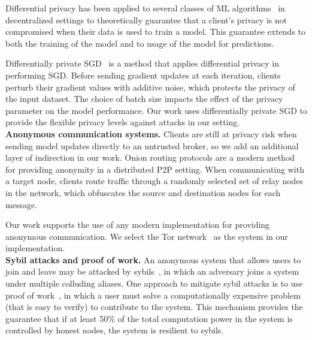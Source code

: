 Differential privacy has been applied to several classes of ML
algorithms~\cite{Shokri:2015, Bellet:2017} in decentralized settings to
theoretically guarantee that a client's privacy is not compromised when
their data is used to train a model. This guarantee extends to both the
training of the model and to usage of the model for predictions.

Differentially private SGD~\cite{Song:2013, Geyer:2017} is a method
that applies differential privacy in performing SGD. Before sending
gradient updates at each iteration, clients perturb their gradient
values with additive noise, which protects the privacy of the input
dataset. The choice of batch size impacts the effect of the privacy
parameter on the model performance. Our work uses differentially
private SGD to provide the flexible privacy levels against attacks in
our setting.\\

\noindent \textbf{Anonymous communication systems.}
Clients are still at privacy risk when sending model updates directly
to an untrusted broker, so we add an additional layer of indirection in
our work. Onion routing protocols are a modern method for providing
anonymity in a distributed \ac{P2P} setting. When
communicating with a target node, clients route traffic through a
randomly selected set of relay nodes in the network, which obfuscates
the source and destination nodes for each message.

Our work supports the use of any modern implementation for providing
anonymous communication. We select the Tor 
network~\cite{Dingledine:2004} as the system in our implementation. \\

\noindent \textbf{Sybil attacks and proof of work.}
%
An anonymous system that allows users to join and leave may be attacked
by sybils~\cite{Douceur:2002}, in which an adversary joins a system
under multiple colluding aliases. One approach to mitigate sybil
attacks is to use proof of work~\cite{Back:2002}, in which a user must
solve a computationally expensive problem (that is easy to verify) to
contribute to the system. This mechanism provides the guarantee that if
at least 50\% of the total computation power in the system is
controlled by honest nodes, the system is resilient to sybils.

